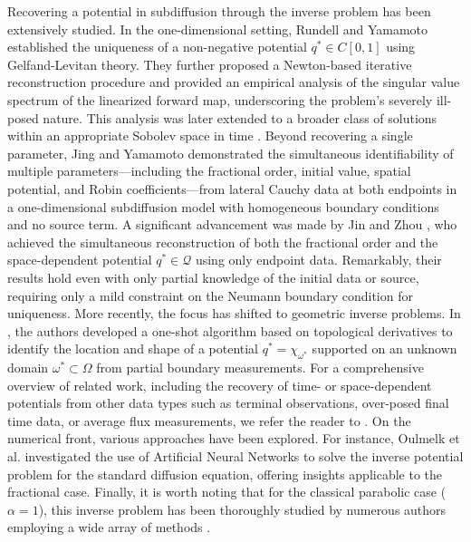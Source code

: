 \documentclass[a4paper,12pt,reqno,natbib]{amsart}
\begin{document}
Recovering a potential in subdiffusion through the inverse problem has been extensively studied. In the one-dimensional setting, Rundell and Yamamoto \cite{rundell2018recovery} established the uniqueness of a non-negative potential $q^* \in C[0,1]$ using Gelfand-Levitan theory. They further proposed a Newton-based iterative reconstruction procedure and provided an empirical analysis of the singular value spectrum of the linearized forward map, underscoring the problem's severely ill-posed nature. This analysis was later extended to a broader class of solutions within an appropriate Sobolev space in time \cite{rundell2023uniqueness10}. Beyond recovering a single parameter, Jing and Yamamoto \cite{jing2021simultaneous} demonstrated the simultaneous identifiability of multiple parameters—including the fractional order, initial value, spatial potential, and Robin coefficients—from lateral Cauchy data at both endpoints in a one-dimensional subdiffusion model with homogeneous boundary conditions and no source term. A significant advancement was made by Jin and Zhou \cite{jin2021recovering}, who achieved the simultaneous reconstruction of both the fractional order and the space-dependent potential $q^* \in \mathcal{Q}$ using only endpoint data. Remarkably, their results hold even with only partial knowledge of the initial data or source, requiring only a mild constraint on the Neumann boundary condition for uniqueness. More recently, the focus has shifted to geometric inverse problems. In \cite{kahlaoui2024reconstruction}, the authors developed a one-shot algorithm based on topological derivatives to identify the location and shape of a potential $q^* = \chi_{\omega^*}$ supported on an unknown domain $\omega^* \subset \Omega$ from partial boundary measurements. For a comprehensive overview of related work, including the recovery of time- or space-dependent potentials from other data types such as terminal observations, over-posed final time data, or average flux measurements, we refer the reader to \cite{jin2020inverse,kaltenbacher2019inverse,kian2019reconstruction,miller2013coefficient,oulmelk2023inverse,zhang2017recovering,zheng2020identification}. On the numerical front, various approaches have been explored. For instance, Oulmelk et al. \cite{oulmelk2023artificial} investigated the use of Artificial Neural Networks to solve the inverse potential problem for the standard diffusion equation, offering insights applicable to the fractional case. Finally, it is worth noting that for the classical parabolic case ($\alpha=1$), this inverse problem has been thoroughly studied by numerous authors employing a wide array of methods \cite{ammari2017use,avdonin1995identification,BerettaSpace2011,cao2018determination,cao2018reconstruction,ImanuvilovNeumann2024,klibanov2013carleman,nguyen2017numerical,trucu2011reconstruction}.
\end{document}
